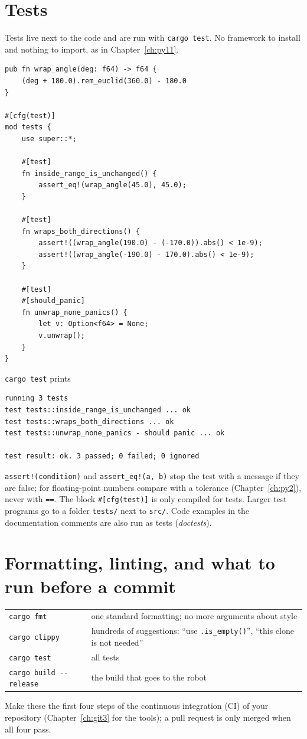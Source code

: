 \section*{Tests}
Tests live next to the code and are run with \verb!cargo test!. No framework to install and nothing to import, as in Chapter~\ref{ch:py11}.
\begin{verbatim}
pub fn wrap_angle(deg: f64) -> f64 {
    (deg + 180.0).rem_euclid(360.0) - 180.0
}

#[cfg(test)]
mod tests {
    use super::*;

    #[test]
    fn inside_range_is_unchanged() {
        assert_eq!(wrap_angle(45.0), 45.0);
    }

    #[test]
    fn wraps_both_directions() {
        assert!((wrap_angle(190.0) - (-170.0)).abs() < 1e-9);
        assert!((wrap_angle(-190.0) - 170.0).abs() < 1e-9);
    }

    #[test]
    #[should_panic]
    fn unwrap_none_panics() {
        let v: Option<f64> = None;
        v.unwrap();
    }
}
\end{verbatim}
\verb!cargo test! prints
\begin{verbatim}
running 3 tests
test tests::inside_range_is_unchanged ... ok
test tests::wraps_both_directions ... ok
test tests::unwrap_none_panics - should panic ... ok

test result: ok. 3 passed; 0 failed; 0 ignored
\end{verbatim}
\verb|assert!(condition)| and \verb|assert_eq!(a, b)| stop the test with a message if they are false; for floating-point numbers compare with a tolerance (Chapter~\ref{ch:py2}), never with \verb!==!. The block \verb!#[cfg(test)]! is only compiled for tests. Larger test programs go to a folder \verb!tests/! next to \verb!src/!. Code examples in the documentation comments are also run as tests (\emph{doctests}).

\section*{Formatting, linting, and what to run before a commit}
\begin{center}
\renewcommand{\arraystretch}{1.2}
\begin{tabular}{lp{8.6cm}}
\verb!cargo fmt! & one standard formatting; no more arguments about style\\
\verb!cargo clippy! & hundreds of suggestions: ``use \verb!.is_empty()!'', ``this clone is not needed''\\
\verb!cargo test! & all tests\\
\verb!cargo build --release! & the build that goes to the robot\\
\end{tabular}
\end{center}
Make these the first four steps of the continuous integration (CI) of your repository (Chapter~\ref{ch:git3} for the tools); a pull request is only merged when all four pass.

